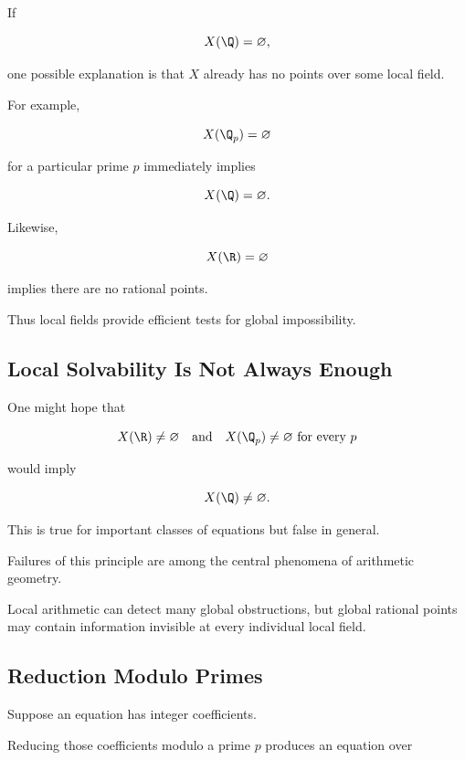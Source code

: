 If

\[ X(\Q)=\varnothing, \]

one possible explanation is that \(X\) already has no points over some local
field.

For example,

\[ X(\Q_p)=\varnothing \]

for a particular prime \(p\) immediately implies

\[ X(\Q)=\varnothing. \]

Likewise,

\[ X(\R)=\varnothing \]

implies there are no rational points.

Thus local fields provide efficient tests for global impossibility.

\subsection{Local Solvability Is Not Always Enough}
\label{subsec:local-not-always-global}

One might hope that

\[
X(\R)\neq\varnothing
\quad\text{and}\quad
X(\Q_p)\neq\varnothing
\text{ for every }p
\]

would imply

\[ X(\Q)\neq\varnothing. \]

This is true for important classes of equations but false in general.

Failures of this principle are among the central phenomena of arithmetic
geometry.

\begin{conceptbox}
Local arithmetic can detect many global obstructions, but global rational
points may contain information invisible at every individual local field.
\end{conceptbox}

\subsection{Reduction Modulo Primes}
\label{subsec:reduction-modulo-primes-arithmetic-geometry}

Suppose an equation has integer coefficients.

Reducing those coefficients modulo a prime \(p\) produces an equation over

